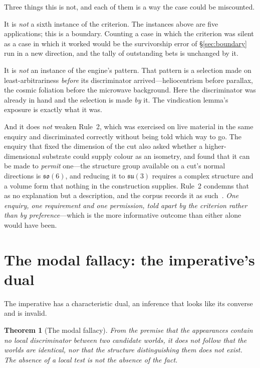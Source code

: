 \documentclass[11pt,a4paper]{article}
\newtheorem{theorem}{Theorem}
\begin{document}
Three things this is not, and each of them is a way the case could be miscounted.

It is \emph{not} a sixth instance of the criterion. The instances above are five applications; this is a
boundary. Counting a case in which the criterion was silent as a case in which it worked would be the
survivorship error of \S\ref{sec:boundary} run in a new direction, and the tally of outstanding bets is
unchanged by it.

It is \emph{not} an instance of the engine's pattern. That pattern is a selection made on least-arbitrariness
\emph{before} its discriminator arrived---heliocentrism before parallax, the cosmic foliation before the
microwave background. Here the discriminator was already in hand and the selection is made \emph{by} it. The
vindication lemma's exposure is exactly what it was.

And it does \emph{not} weaken Rule~2, which was exercised on live material in the same enquiry and
discriminated correctly without being told which way to go. The enquiry that fixed the dimension of the cut
also asked whether a higher-dimensional substrate could supply colour as an isometry, and found that it can be
made to \emph{permit} one---the structure group available on a cut's normal directions is $\mathfrak{so}(6)$,
and reducing it to $\mathfrak{su}(3)$ requires a complex structure and a volume form that nothing in the
construction supplies. Rule~2 condemns that as no explanation but a description, and the corpus records it as
such~\cite{JanzenBoundary}. \emph{One enquiry, one requirement and one permission, told apart by the criterion
rather than by preference}---which is the more informative outcome than either alone would have been.

\section{The modal fallacy: the imperative's dual}\label{sec:modal}

The imperative has a characteristic dual, an inference that looks like its converse and is invalid.

\begin{theorem}[The modal fallacy]\label{thm:modal}
From the premise that the appearances contain no local discriminator between two candidate worlds, it does not follow that the worlds are identical, nor that the structure distinguishing them does not exist. The absence of a local test is not the absence of the fact.
\end{theorem}
\end{document}
